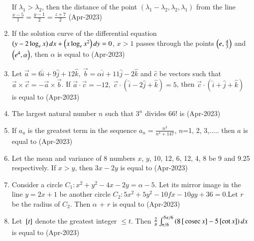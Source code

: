 \documentclass[journal]{IEEEtran}
\numberwithin{equation}{enumi}
\numberwithin{figure}{enumi}
\begin{document}
\begin{enumerate}
If $\lambda_1 > \lambda_2$, then the distance of the point $(\lambda_1 - \lambda_2, \lambda_2, \lambda_1)$ 
from the line $\frac{x - 5}{1} = \frac{y - 1}{2} = \frac{z + 7}{2}$
\hfill(Apr-2023)
\item If the solution curve of the differential equation $\left(y - 2 \log_e x\right)dx + \left(x \log_e x^2\right)dy = 0$, $x > 1$ passes through the points $\left(e, \frac{4}{3}\right)$ and  $\left(e^4, \alpha\right)$, then $\alpha$ is equal to 
\hfill(Apr-2023)
\item Let \(\vec{a} = 6\hat{i} + 9\hat{j} + 12\hat{k}, \ \vec{b} = \alpha\hat{i} + 11\hat{j} - 2\hat{k}\) and \(\hat{c}\) be vectors such that \(\vec{a} \times \vec{c} = -\vec{a} \times \vec{b}\). If \(\vec{a} \cdot \vec{c} = -12, \ \vec{c} \cdot (\hat{i} - 2\hat{j} + \hat{k}) = 5\), then \(\vec{c} \cdot (\hat{i} + \hat{j} + \hat{k})\) is equal to 
\hfill(Apr-2023)
\item The largest natural number $n$ such that $3^n$ divides 66! is
\hfill(Apr-2023)
\item If $a_a$ is the greatest term in the sequence $a_n=\frac{n^3}{n^4 + 147}$, $n$=1, 2, 3,..... then $a$ is equal to \hfill(Apr-2023)
\item Let the mean and variance of 8 numbers $x$, $y$, 10, 12, 6, 12, 4, 8 be 9 and 9.25 respectively. If $x>y$, then $3x-2y$ is equal to 
\hfill(Apr-2023)
\item Consider a circle $C_1 : x^2+y^2-4x-2y=\alpha-5$. Let its mirror  image in the line $y=2x+1$ be another circle $C_2 : 5x^2+5y^2 -10fx-10gy+36=0 $.Let $r$ be the radius of $C_2$. Then $\alpha$ + $r$ is equal to
\hfill(Apr-2023)
\item Let ${}\left[t\right]$ denote the greatest integer $\leq t$. Then $\frac{2}{\pi} \int_{\pi/6}^{5\pi/6} \left(8{}\left[\,\text{cosec}\, x\right] - 5{}\left[\cot x\right] \right) dx$ is equal to 
\hfill(Apr-2023)






\end{enumerate}
\end{document}
